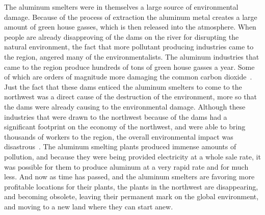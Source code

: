 \documentclass[12pt,twoside]{article}
\begin{document}
The aluminum smelters were in themselves a large source of environmental
damage. Because of the process of extraction the aluminum metal creates a large
amount of green house gasses, which is then released into the atmosphere. When
people are already disapproving of the dams on the river for disrupting the
natural environment, the fact that more pollutant producing industries came to
the region, angered many of the environmentalists. The aluminum industries that
came to the region produce hundreds of tons of green house gasses a year. Some
of which are orders of magnitude more damaging the common carbon
dioxide~\cite{APA}. Just the fact that these dams enticed the aluminum smelters
to come to the northwest was a direct cause of the destruction of the
environment, more so that the dams were already causing to the environmental
damage. Although these industries that were drawn to the northwest because of
the dams had a significant footprint on the economy of the northwest, and were
able to bring thousands of workers to the region, the overall environmental
impact was disastrous~\cite{OAI}. The aluminum smelting plants produced immense
amounts of pollution, and because they were being provided electricity at a
whole sale rate, it was possible for them to produce aluminum at a very rapid
rate and for much less. And now as time has passed, and the aluminum smelters
are favoring more profitable locations for their plants, the plants in the
northwest are disappearing, and becoming obsolete, leaving their permanent mark
on the global environment, and moving to a new land where they can start anew.
\end{document}
